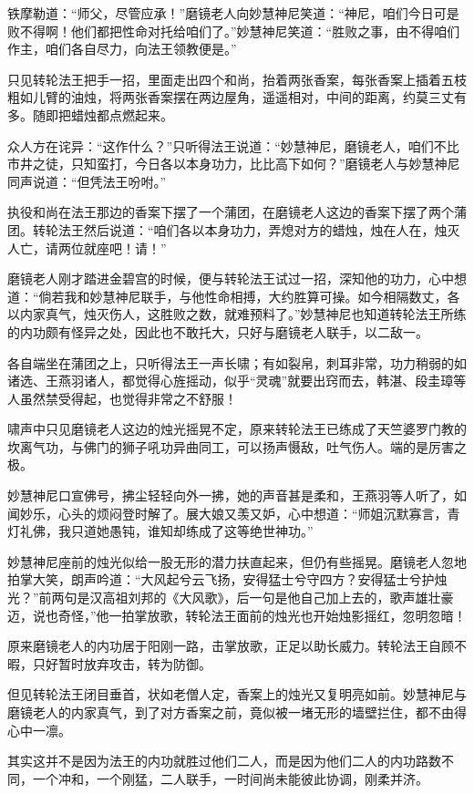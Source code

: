 \documentclass[12pt,oneside]{book}
\begin{document}
铁摩勒道：``师父，尽管应承！''磨镜老人向妙慧神尼笑道：``神尼，咱们今日可是败不得啊！他们都把性命对托给咱们了。''妙慧神尼笑道：``胜败之事，由不得咱们作主，咱们各自尽力，向法王领教便是。''

只见转轮法王把手一招，里面走出四个和尚，抬着两张香案，每张香案上插着五枝粗如儿臂的油烛，将两张香案摆在两边屋角，遥遥相对，中间的距离，约莫三丈有多。随即把蜡烛都点燃起来。

众人方在诧异：``这作什么？''只听得法王说道：``妙慧神尼，磨镜老人，咱们不比市井之徒，只知蛮打，今日各以本身功力，比比高下如何？''磨镜老人与妙慧神尼同声说道：``但凭法王吩咐。''

执役和尚在法王那边的香案下摆了一个蒲团，在磨镜老人这边的香案下摆了两个蒲团。转轮法王然后说道：``咱们各以本身功力，弄熄对方的蜡烛，烛在人在，烛灭人亡，请两位就座吧！请！''

磨镜老人刚才踏进金碧宫的时候，便与转轮法王试过一招，深知他的功力，心中想道：``倘若我和妙慧神尼联手，与他性命相搏，大约胜算可操。如今相隔数丈，各以内家真气，烛灭伤人，这胜败之数，就难预料了。''妙慧神尼也知道转轮法王所练的内功颇有怪异之处，因此也不敢托大，只好与磨镜老人联手，以二敌一。

各自端坐在蒲团之上，只听得法王一声长啸；有如裂帛，刺耳非常，功力稍弱的如诸选、王燕羽诸人，都觉得心旌摇动，似乎``灵魂''就要出窍而去，韩湛、段圭璋等人虽然禁受得起，也觉得非常之不舒服！

啸声中只见磨镜老人这边的烛光摇晃不定，原来转轮法王已练成了天竺婆罗门教的坎离气功，与佛门的狮子吼功异曲同工，可以扬声慑敌，吐气伤人。端的是厉害之极。

妙慧神尼口宣佛号，拂尘轻轻向外一拂，她的声音甚是柔和，王燕羽等人听了，如闻妙乐，心头的烦闷登时解了。展大娘又羡又妒，心中想道：``师姐沉默寡言，青灯礼佛，我只道她愚钝，谁知却练成了这等绝世神功。''

妙慧神尼座前的烛光似给一股无形的潜力扶直起来，但仍有些摇晃。磨镜老人忽地拍掌大笑，朗声吟道：``大风起兮云飞扬，安得猛士兮守四方？安得猛士兮护烛光？''前两句是汉高祖刘邦的《大风歌》，后一句是他自己加上去的，歌声雄壮豪迈，说也奇怪，''他一拍掌放歌，转轮法王面前的烛光也开始烛影摇红，忽明忽暗！

原来磨镜老人的内功居于阳刚一路，击掌放歌，正足以助长威力。转轮法王自顾不暇，只好暂时放弃攻击，转为防御。

但见转轮法王闭目垂首，状如老僧人定，香案上的烛光又复明亮如前。妙慧神尼与磨镜老人的内家真气，到了对方香案之前，竟似被一堵无形的墙壁拦住，都不由得心中一凛。

其实这并不是因为法王的内功就胜过他们二人，而是因为他们二人的内功路数不同，一个冲和，一个刚猛，二人联手，一时间尚未能彼此协调，刚柔并济。
\end{document}
